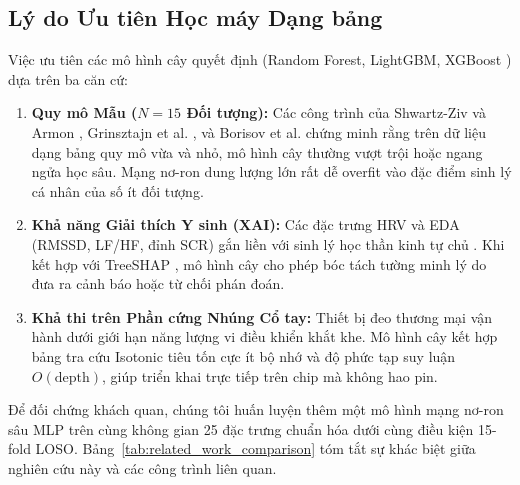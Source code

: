 \documentclass[conference]{IEEEtran}
\begin{document}
\subsection{Lý do Ưu tiên Học máy Dạng bảng}
Việc ưu tiên các mô hình cây quyết định (Random Forest, LightGBM, XGBoost \cite{chen2016xgboost}) dựa trên ba căn cứ:
\begin{enumerate}
    \item \textbf{Quy mô Mẫu ($N=15$ Đối tượng):} Các công trình của Shwartz-Ziv và Armon \cite{shwartzziv2022tabular}, Grinsztajn et al. \cite{grinsztajn2022why}, và Borisov et al. \cite{borisov2024deep} chứng minh rằng trên dữ liệu dạng bảng quy mô vừa và nhỏ, mô hình cây thường vượt trội hoặc ngang ngửa học sâu. Mạng nơ-ron dung lượng lớn rất dễ overfit vào đặc điểm sinh lý cá nhân của số ít đối tượng.
    \item \textbf{Khả năng Giải thích Y sinh (XAI):} Các đặc trưng HRV và EDA (RMSSD, LF/HF, đỉnh SCR) gắn liền với sinh lý học thần kinh tự chủ \cite{taskforce1996heart, makowski2021neurokit2, boucsein2012electrodermal, tarvainen2014kubios}. Khi kết hợp với TreeSHAP \cite{lundberg2020local}, mô hình cây cho phép bóc tách tường minh lý do đưa ra cảnh báo hoặc từ chối phán đoán.
    \item \textbf{Khả thi trên Phần cứng Nhúng Cổ tay:} Thiết bị đeo thương mại vận hành dưới giới hạn năng lượng vi điều khiển khắt khe. Mô hình cây kết hợp bảng tra cứu Isotonic tiêu tốn cực ít bộ nhớ và độ phức tạp suy luận $O(\text{depth})$, giúp triển khai trực tiếp trên chip mà không hao pin.
\end{enumerate}

Để đối chứng khách quan, chúng tôi huấn luyện thêm một mô hình mạng nơ-ron sâu MLP trên cùng không gian 25 đặc trưng chuẩn hóa dưới cùng điều kiện 15-fold LOSO. Bảng~\ref{tab:related_work_comparison} tóm tắt sự khác biệt giữa nghiên cứu này và các công trình liên quan.
\end{document}
